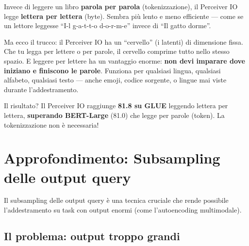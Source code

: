 \documentclass[12pt,a4paper]{article}
\begin{document}
\begin{notabox}
Invece di leggere un libro \textbf{parola per parola} (tokenizzazione), il Perceiver IO legge \textbf{lettera per lettera} (byte). Sembra pi\`u lento e meno efficiente --- come se un lettore leggesse ``I-l g-a-t-t-o d-o-r-m-e'' invece di ``Il gatto dorme''.

Ma ecco il trucco: il Perceiver IO ha un ``cervello'' (i latenti) di dimensione fissa. Che tu legga per lettere o per parole, il cervello comprime tutto nello stesso spazio. E leggere per lettere ha un vantaggio enorme: \textbf{non devi imparare dove iniziano e finiscono le parole}. Funziona per qualsiasi lingua, qualsiasi alfabeto, qualsiasi testo --- anche emoji, codice sorgente, o lingue mai viste durante l'addestramento.

Il risultato? Il Perceiver IO raggiunge \textbf{81.8 su GLUE} leggendo lettera per lettera, \textbf{superando BERT-Large} (81.0) che legge per parole (token). La tokenizzazione non \`e necessaria!
\end{notabox}


\section{Approfondimento: Subsampling delle output query}

Il subsampling delle output query \`e una tecnica cruciale che rende possibile l'addestramento su task con output enormi (come l'autoencoding multimodale).

\subsection{Il problema: output troppo grandi}
\end{document}
